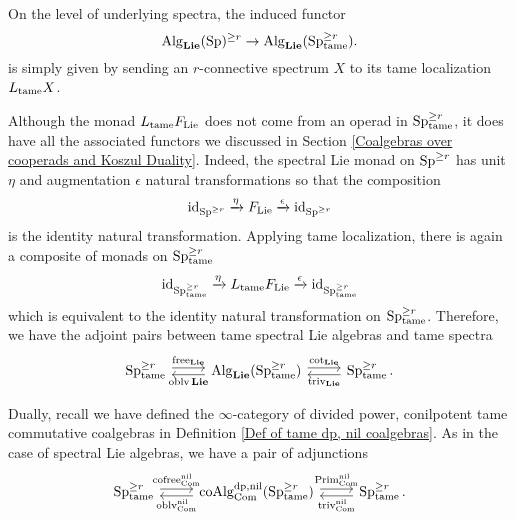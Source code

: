 On the level of underlying spectra,
the induced functor 
$$
\operatorname{Alg}_{\mathbf{Lie}}(\operatorname{Sp})^{\geq r} 
\to 
\operatorname{Alg}_{\mathbf{Lie}}(\operatorname{Sp}^{\geq r}_{\operatorname{\operatorname{tame}}}).
$$
is simply given by sending an $r$-connective spectrum $X$ to its tame localization $L_{\operatorname{\operatorname{tame}}}X$.

\begin{remark}
Although the monad $L_{\operatorname{\operatorname{tame}}}F_{\operatorname{Lie}}$ does not come from an operad in $\operatorname{Sp}^{\geq r}_{\operatorname{\operatorname{tame}}}$, it does have all the associated functors we discussed in Section \ref{Coalgebras over cooperads and Koszul Duality}.
Indeed, the spectral Lie monad on $\operatorname{Sp}^{\geq r}$ has unit $\eta$ and augmentation $\epsilon$ natural transformations so that the composition 
\[
\operatorname{id}_{\operatorname{Sp}^{\geq r}}
\xrightarrow{\eta}
F_{\operatorname{Lie}}\xrightarrow{\epsilon}
\operatorname{id}_{\operatorname{Sp}^{\geq r}}
\]
is the identity natural transformation.
Applying tame localization, there is again a composite of monads on $\operatorname{Sp}^{\geq r}_{\operatorname{\operatorname{tame}}}$
\[
\operatorname{id}_{\operatorname{Sp}^{\geq r}_{\operatorname{\operatorname{tame}}}}
\xrightarrow{\eta}
L_{\operatorname{\operatorname{tame}}}F_{\operatorname{Lie}}\xrightarrow{\epsilon}
\operatorname{id}_{\operatorname{Sp}^{\geq r}_{\operatorname{\operatorname{tame}}}}
\]
which is equivalent to the identity natural transformation on $\operatorname{Sp}^{\geq r}_{\operatorname{\operatorname{tame}}}$.
Therefore, we have the adjoint pairs between tame spectral Lie algebras and tame spectra
\[
\begin{tikzcd}
\Sp^{\geq r}_{\tame} & \Alg_{\spLie}(\Sp^{\geq r}_{\tame}) & \Sp^{\geq r}_{\tame}
	\arrow[from=1-1, to= 1-2, shift left = 1, "\Free_{\spLie}" above]
	\arrow[from=1-2, to=1-1, shift left = 1, "\oblv{\spLie}" below]
	\arrow[from=1-2, to= 1-3, shift left = 1, "\cot_{\spLie}" above]
	\arrow[from=1-3, to=1-2, shift left = 1, "\trivial_{\spLie}" below].
\end{tikzcd}
\]
\end{remark}

\begin{remark}
Dually, recall we have defined the $\infty$-category of divided power, conilpotent tame commutative coalgebras in Definition \ref{Def of tame dp, nil coalgebras}. 
As in the case of spectral Lie algebras, we have a pair of adjunctions
\[
\begin{tikzcd}
\Sp^{\geq r}_{\tame} & \coAlg^{\divpow, \nil}_{\Com}(\Sp^{\geq r}_{\tame}) & \Sp^{\geq r}_{\tame}.
	\arrow[from=1-1, to= 1-2, shift left = 1, "\cofree^{\nil}_{\Com}" above]
	\arrow[from=1-2, to=1-1, shift left = 1, "\oblv^{\nil}_{\Com}" below]
	\arrow[from=1-2, to= 1-3, shift left = 1, "\operatorname{Prim}^{\nil}_{\Com}" above]
	\arrow[from=1-3, to=1-2, shift left = 1, "\trivial^{\nil}_{\Com}" below]
\end{tikzcd}
\]
\end{remark}





